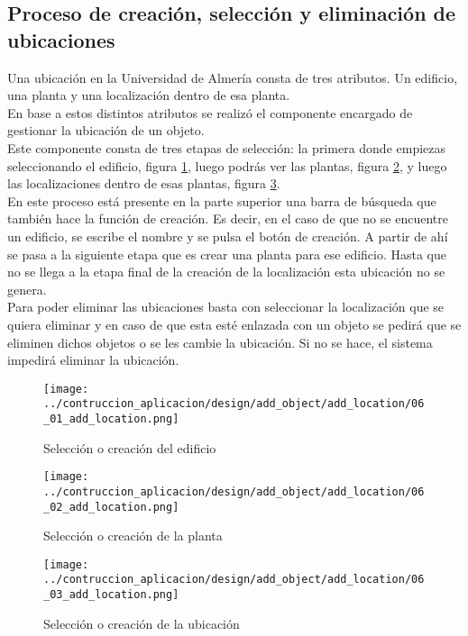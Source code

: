 \subsection{Proceso de creación, selección y eliminación de ubicaciones}
Una ubicación en la Universidad de Almería consta de tres atributos. Un edificio, una planta y una localización dentro de esa planta.
\\En base a estos distintos atributos se realizó el componente encargado de gestionar la ubicación de un objeto.
\\Este componente consta de tres etapas de selección: la primera donde empiezas seleccionando el edificio, figura \ref{fig:1-loc-o}, luego podrás ver las plantas, figura \ref{fig:2-loc-o}, y luego las localizaciones dentro de esas plantas, figura \ref{fig:3-loc-o}.
\\En este proceso está presente en la parte superior una barra de búsqueda que también hace la función de creación. Es decir, en el caso de que no se encuentre un edificio, se escribe el nombre y se pulsa el botón de creación. A partir de ahí se pasa a la siguiente etapa que es crear una planta para ese edificio. Hasta que no se llega a la etapa final de la creación de la localización esta ubicación no se genera.
\\Para poder eliminar las ubicaciones basta con seleccionar la localización que se quiera eliminar y en caso de que esta esté enlazada con un objeto se pedirá que se eliminen dichos objetos o se les cambie la ubicación. Si no se hace, el sistema impedirá eliminar la ubicación.
\begin{figure}[ht]
    \centering
    \texttt{[image: ../contruccion\_aplicacion/design/add\_object/add\_location/06\_01\_add\_location.png]}
    \caption{Selección o creación del edificio}\label{fig:1-loc-o}
\end{figure}
\begin{figure}[ht]
    \centering
    \texttt{[image: ../contruccion\_aplicacion/design/add\_object/add\_location/06\_02\_add\_location.png]}
    \caption{Selección o creación de la planta}\label{fig:2-loc-o}
\end{figure}
\begin{figure}[ht]
    \centering
    \texttt{[image: ../contruccion\_aplicacion/design/add\_object/add\_location/06\_03\_add\_location.png]}
    \caption{Selección o creación de la ubicación}\label{fig:3-loc-o}
\end{figure}